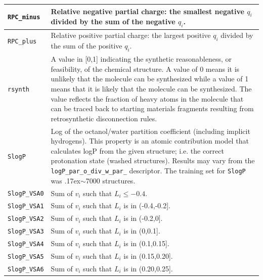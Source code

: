 \documentclass[12pt,a4paper]{article}
\begin{document}
\begin{longtable}{@{\zz}|p{}|p{}|}
\texttt{RPC\_minus} & Relative negative partial charge: the smallest 
negative $q_i$ divided by the sum of the negative $q_i$.\\ \hline

\texttt{RPC\_plus} & Relative positive partial charge: the largest 
positive $q_i$ divided by the sum of the positive $q_i$.\\ \hline

\texttt{rsynth} & A value in [0,1] indicating the synthetic 
reasonableness, or feasibility, of the chemical structure. A value 
of 0 means it is unlikely that the molecule can be synthesized while 
a value of 1 means that it is likely that the molecule can be 
synthesized. The value reflects the fraction of heavy atoms in the 
molecule that can be traced back to starting materials fragments 
resulting from retrosynthetic disconnection rules.\\ \hline

\texttt{SlogP} & Log of the octanol/water partition coefficient 
(including implicit hydrogens). This property is an atomic 
contribution model \cite{Wildman1999} that calculates logP from 
the given structure; i.e. the correct protonation state 
(washed structures). Results may vary from the 
\texttt{logP\_par\_o\_div\_w\_par\_} descriptor. The training set 
for \texttt{SlogP} was {\raise.17ex\hbox{$\scriptstyle\sim$}}7000 
structures.\\ \hline

\texttt{SlogP\_VSA0} & Sum of $v_i$ such that $L_i\leq-0.4$.\\ \hline

\texttt{SlogP\_VSA1} & Sum of $v_i$ such that $L_i$ is in (-0.4,-0.2].\\ \hline

\texttt{SlogP\_VSA2} & Sum of $v_i$ such that $L_i$ is in (-0.2,0].\\ \hline

\texttt{SlogP\_VSA3} & Sum of $v_i$ such that $L_i$ is in (0,0.1].\\ \hline

\texttt{SlogP\_VSA4} & Sum of $v_i$ such that $L_i$ is in (0.1,0.15].\\ \hline

\texttt{SlogP\_VSA5} & Sum of $v_i$ such that $L_i$ is in (0.15,0.20].\\ \hline

\texttt{SlogP\_VSA6} & Sum of $v_i$ such that $L_i$ is in (0.20,0.25].\\ \hline


\end{longtable}
\end{document}
